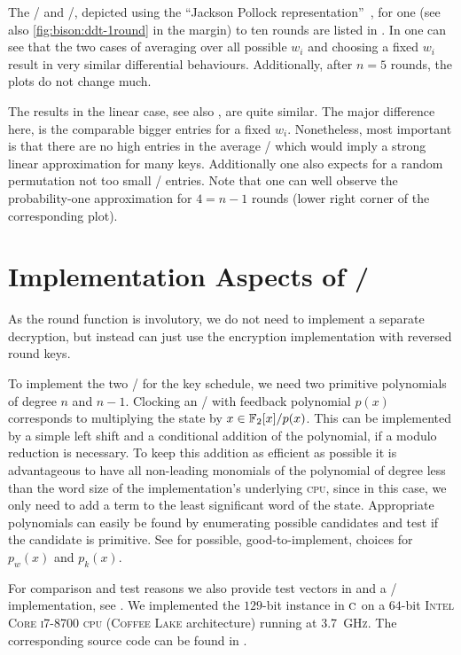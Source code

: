 The \DDTp/ and \LATp/, depicted using the \enquote{Jackson Pollock representation}~\cite{C:BirPer15}, for one (see also \cref{fig:bison:ddt-1round} in the margin) to ten rounds are listed in
\cite[Appendix~B]{EPRINT:CLLNW18}%
.
In
\cite[Appendix~B]{EPRINT:CLLNW18}
one can see that the two cases of averaging over all possible $w_i$ and choosing a fixed $w_i$ result in very similar differential behaviours.
Additionally, after $n = 5$ rounds, the plots do not change much.

The results in the linear case, see
also \cite[Appendix~B]{EPRINT:CLLNW18}%
, are quite similar.
The major difference here, is the comparable bigger entries for a fixed $w_i$.
Nonetheless, most important is that there are no high entries in the average \LAT/ which would imply a strong linear approximation for many keys.
Additionally one also expects for a random permutation not too small \LAT/ entries.
Note that one can well observe the probability-one approximation for $4 = n-1$ rounds (lower right corner of the corresponding plot).

\section{Implementation Aspects of \bison/}\label{sec:bison:implementation}
As the round function is involutory, we do not need to implement a separate decryption, but instead can just use the encryption implementation with reversed round keys.

To implement the two \LFSRp/ for the key schedule, we need two primitive polynomials of degree $n$ and $n-1$.
Clocking an \LFSR/ with feedback polynomial $p(x)$ corresponds to multiplying the state by $x \in \mathbb{F}_2[x]/p(x)$.
This can be implemented by a simple left shift and a conditional addition of the polynomial, if a modulo reduction is necessary.
To keep this addition as efficient as possible it is advantageous to have all non-leading monomials of the polynomial of degree less than the word size of the implementation's underlying \textsc{cpu}, since in this case, we only need to add a term to the least significant word of the state.
Appropriate polynomials can easily be found by enumerating possible candidates and test if the candidate is primitive.
See
\cite[Appendix~A]{EPRINT:CLLNW18}
for possible, good-to-implement, choices for $p_w(x)$ and $p_k(x)$.

For comparison and test reasons we also provide test vectors in
\cite[Appendix~C]{EPRINT:CLLNW18}
and a \sage/ implementation, see
\cite[Appendix~E]{EPRINT:CLLNW18}%
.
We implemented the $129$-bit instance in $\textsc{c}$ on a $64$-bit \textsc{Intel Core i7-8700 cpu} (\textsc{Coffee Lake} architecture) running at 3.7~\textsc{GHz}.
The corresponding source code can be found in
\cite[Appendix~G]{EPRINT:CLLNW18}%
.

